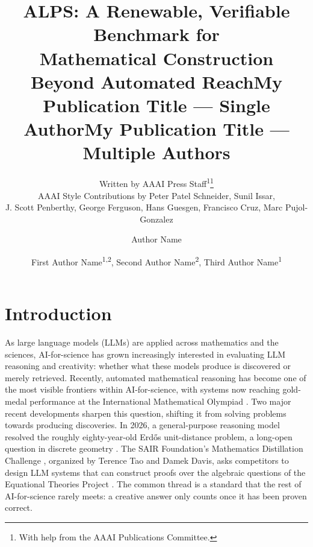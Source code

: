 \documentclass[letterpaper]{article} %
\title{ALPS: A Renewable, Verifiable Benchmark for \\ Mathematical Construction Beyond Automated Reach}
\author{
    Written by AAAI Press Staff\textsuperscript{\rm 1}\thanks{With help from the AAAI Publications Committee.}\\
    AAAI Style Contributions by Peter Patel Schneider,
    Sunil Issar,\\
    J. Scott Penberthy,
    George Ferguson,
    Hans Guesgen,
    Francisco Cruz\equalcontrib\corresponding,
    Marc Pujol-Gonzalez\equalcontrib\corresponding
}
\title{My Publication Title --- Single Author}
\author {
    Author Name
}
\title{My Publication Title --- Multiple Authors}
\author {
    First Author Name\textsuperscript{\rm 1,\rm 2}\equalcontrib,
    Second Author Name\textsuperscript{\rm 2}\equalcontrib,
    Third Author Name\textsuperscript{\rm 1}\corresponding
}
\begin{document}
\maketitle

\begin{abstract}

\end{abstract}


\section{Introduction}


As large language models (LLMs) are applied across mathematics and the sciences, AI-for-science has grown increasingly interested in evaluating LLM reasoning and creativity: whether what these models produce is discovered or merely retrieved. Recently, automated mathematical reasoning has become one of the most visible frontiers within AI-for-science, with systems now reaching gold-medal performance at the International Mathematical Olympiad \citep{deepmind2025imo}. Two major recent developments sharpen this question, shifting it from solving problems towards producing discoveries. In 2026, a general-purpose reasoning model resolved the roughly eighty-year-old Erdős unit-distance problem, a long-open question in discrete geometry \citep{openai2026unitdistance}. The SAIR Foundation's Mathematics Distillation Challenge \citep{tao2026distillation}, organized by Terence Tao and Damek Davis, asks competitors to design LLM systems that can construct proofs over the algebraic questions of the Equational Theories Project \citep{bolan2025equational}. The common thread is a standard that the rest of AI-for-science rarely meets: a creative answer only counts once it has been proven correct. 


\end{document}

